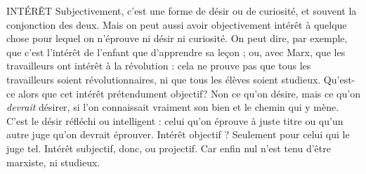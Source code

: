 INTÉRÊT Subjectivement, c’est une forme de désir ou de curiosité, et souvent
la conjonction des deux. Mais on peut aussi avoir objectivement
intérêt à quelque chose pour lequel on n’éprouve ni désir ni curiosité. On
peut dire, par exemple, que c’est l'intérêt de l’enfant que d’apprendre sa leçon ;
ou, avec Marx, que les travailleurs ont intérêt à la révolution : cela ne prouve
pas que tous les travailleurs soient révolutionnaires, ni que tous les élèves soient
studieux.
Qu'est-ce alors que cet intérêt prétendument objectif? Non ce qu'on
désire, mais ce qu’on {\it devrait} désirer, si l’on connaissait vraiment son bien et le
chemin qui y mène. C’est le désir réfléchi ou intelligent : celui qu’on éprouve à
juste titre ou qu’un autre juge qu’on devrait éprouver. Intérêt objectif ? Seulement
pour celui qui le juge tel. Intérêt subjectif, donc, ou projectif. Car enfin
nul n’est tenu d’être marxiste, ni studieux.

